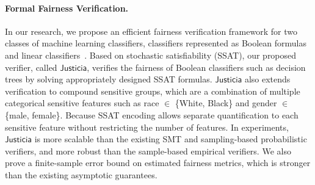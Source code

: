 \documentclass[11pt]{article}
\begin{document}
	
	
	
	\paragraph{Formal Fairness Verification.} In our research, we propose an efficient fairness verification framework for two classes of machine learning classifiers, classifiers represented as Boolean formulas~\cite{ghosh2021justicia} and linear classifiers~\cite{ghosh2022algorithmic}. Based on stochastic satisfiability (SSAT), our proposed verifier, called $ \mathsf{Justicia} $, verifies the fairness of Boolean classifiers such as decision trees by solving appropriately designed SSAT formulas. $ \mathsf{Justicia} $ also extends verification to compound sensitive groups, which are a combination of multiple categorical sensitive features such as race $ \in $ \{White, Black\} and gender $ \in $ \{male, female\}. Because SSAT encoding allows separate quantification to each sensitive feature without restricting the number of features. In experiments, $ \mathsf{Justicia} $ is more scalable than the existing SMT and sampling-based probabilistic verifiers, and more robust than the sample-based empirical verifiers. We also prove a finite-sample error bound on estimated fairness metrics, which is stronger than the existing asymptotic guarantees.
	
	
\end{document}
